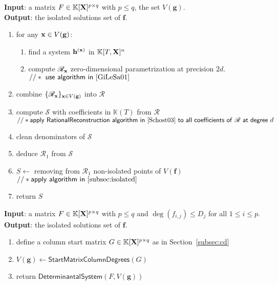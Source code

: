\documentclass[11pt]{article}
\numberwithin{Property}{section}
\numberwithin{Theorem}{section}
\numberwithin{Proposition}{section}
\numberwithin{Lemma}{section}
\numberwithin{Corollary}{section}
\numberwithin{Definition}{section}
\numberwithin{Remark}{section}
\numberwithin{Conjecture}{section}
\numberwithin{Problem}{section}
\numberwithin{Claim}{section}
\theoremstyle{definition}
\numberwithin{Example}{section}
\def\f {\ensuremath{\mathbf{f}}}
\def\h {\ensuremath{\mathbf{h}}}
\def\g {\ensuremath{\mathbf{g}}}
\renewcommand{\leq}{\leqslant}
\newcommand{\field}{\mathbb{K}} %
\newcommand{\mat}[1]{\mathbf{\MakeUppercase{#1}}} %
\begin{document}
\begin{algorithm}
\caption{$\mathsf{Determinantal System}$}
\label{DetSys}
{\bf Input}: a matrix $F \in \field[\mat{X}]^{p \times q}$ with $p \leq q$, the set $V(\g)$.\\
{\bf Output}: the isolated solutions set of $\f$. 
\begin{enumerate}
\item for any ${\bf x} \in V(\g)$: 
\begin{enumerate}
\item find a system $\h^{(\bf x)}$ in $\field[T,\mat{X}]^n$
\item compute $\mathscr{R}_{\bf x}$ zero-dimensional parametrization at precision $2d$. \\
$\mathsf{//* \ use \ algorithm \ in~\cite{GiLeSa01} \ }$
\end{enumerate}
\item combine $\{\mathscr{R}_{\bf x}\}_{{\bf x} \in V(\g)}$ into $\mathscr{R}$
\item compute $\mathscr{S}$ with coefficients in $\field(T)$ from  $\mathscr{R}$\\
$\mathsf{//* apply \ RationalReconstruction \ algorithm \ in~\cite{Schost03} \ to \ all \ coefficients \ of \ \mathscr{R} \ at \ degree} \ d$
\item clean denominators of $\mathscr{S}$
\item deduce $\mathscr{R}_{1}$ from $\mathscr{S}$
\item  $S \gets$ removing from $\mathscr{R}_{1}$ non-isolated points of $V(\f)$\\
$\mathsf{//* apply \ algorithm \ in~\cref{subsec:isolated}}$
\item return $S$
\end{enumerate}
\end{algorithm}
 
\begin{algorithm}
\caption{$\mathsf{ColumnDeterminantal System}$}
\label{CDetSys}
{\bf Input}: a matrix $F \in \field[\mat{X}]^{p \times q}$ with $p \leq q$ and $\deg(f_{i,j}) \leq D_j$ for all $1 \leq i \leq p$.\\
{\bf Output}: the isolated solutions set of $\f$. 
\begin{enumerate}
\item define a column start matrix $G \in \field[\mat{X}]^{p \times q}$ as in Section~\ref{subsec:cd}
\item $V(\g) \gets \mathsf{Start Matrix Column Degrees}(G)$
\item return $\mathsf{Determinantal System}(F, V(\g))$
\end{enumerate}
\end{algorithm}
\end{document}
